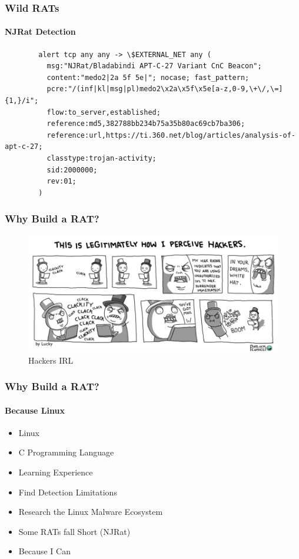 \documentclass[aspectratio=169]{beamer}
\begin{document}
\begin{frame}[fragile]{}
  \frametitle{Wild RATs}
  \framesubtitle{NJRat Detection}
  \begin{center}
    \begin{tcolorbox}[title=njrat.rules,colback=black]
    \begin{minipage}{0.5\textwidth}
      \begin{verbatim}
        alert tcp any any -> \$EXTERNAL_NET any (
          msg:"NJRat/Bladabindi APT-C-27 Variant CnC Beacon";
          content:"medo2|2a 5f 5e|"; nocase; fast_pattern;
          pcre:"/(inf|kl|msg|pl)medo2\x2a\x5f\x5e[a-z,0-9,\+\/,\=]{1,}/i";
          flow:to_server,established;
          reference:md5,382788bb234b75a35b80ac69cb7ba306;
          reference:url,https://ti.360.net/blog/articles/analysis-of-apt-c-27;
          classtype:trojan-activity;
          sid:2000000;
          rev:01;
        )
      \end{verbatim}
    \end{minipage}
    \end{tcolorbox}
  \end{center}
\end{frame}

\begin{frame}
  \frametitle{Why Build a RAT?}
  \begin{center}
    \begin{figure}
      \includegraphics[width=12cm,keepaspectratio]{hackers_meme}
      \caption{Hackers IRL}
    \end{figure}
  \end{center}
\end{frame}

\begin{frame}
  \frametitle{Why Build a RAT?}
  \framesubtitle{Because Linux}
  \begin{itemize}
  \item{Linux}
  \item{C Programming Language}
  \item{Learning Experience}
  \item{Find Detection Limitations}
  \item{Research the Linux Malware Ecosystem}
  \item{Some RATs fall Short (NJRat)}
  \item{Because I Can}
  \end{itemize}
\end{frame}
\end{document}

